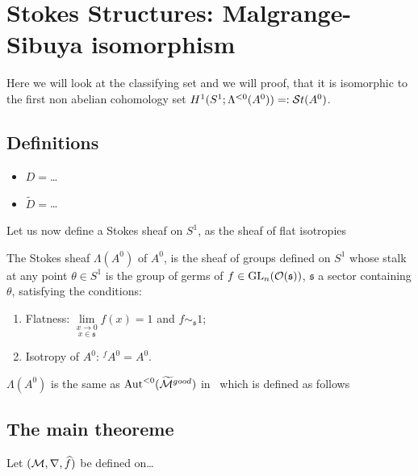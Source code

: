 \section{Stokes Structures: Malgrange-Sibuya isomorphism}
\begin{comment}
  \begin{itemize}
    \item \cite{Loday1994} Thm I.2.1
    \item \cite{Loday2014} Thm. 4.3.9, on p. 78
    \item \cite{sabbah2007isomonodromic} Thm II.6.2
  \end{itemize}
\end{comment}
Here we will look at the classifying set and we will proof, that it is
isomorphic \TODO[as\dots] to the first non abelian cohomology set
$H^1(S^1;\Lambda^{<0}(A^0))=:\mathcal{S}{}t(A^0)$.

\subsection{Definitions}
\begin{itemize}
  \item $D=$\dots
  \item $\tilde D=$\dots
\end{itemize}

Let us now define a Stokes sheaf on $S^1$, as the sheaf of flat
isotropies\TODO[\dots]
\begin{defn}
  The Stokes sheaf $\Lambda(A^0)$ of $A^0$, is the sheaf of groups defined on
  $S^1$ whose stalk at any point $\theta\in S^1$ is the group of germs of
  $f\in\operatorname{GL}_n(\mathcal{O}(\mathfrak{s}))$, $\mathfrak{s}$ a sector containing $\theta$, satisfying
  the conditions:
  \begin{enumerate}
    \item Flatness: $\underset{x\in\mathfrak{s}}{\underset{x\to0}{\lim}}f(x)=1$
      and $f\sim_{\mathfrak{s}} 1$;
    \item Isotropy of $A^0$: ${}^f\!A^0=A^0$.
  \end{enumerate}
  \begin{rem}
    $\Lambda(A^0)$ is the same as $\operatorname{Aut}^{<0}(\widetilde{\mathcal{M}}^{good})$
    in~\cite{sabbah2007isomonodromic} which is defined as follows \TODO
  \end{rem}
\end{defn}

\subsection{The main theoreme}
Let $(\mathcal{M},\nabla,\widehat f)$ be defined on\dots

